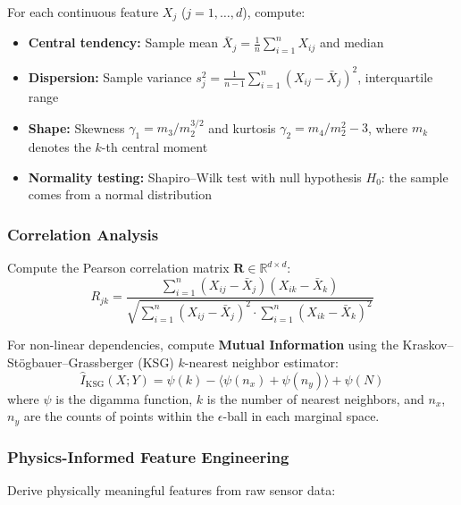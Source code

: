 \documentclass[12pt, a4paper]{article}
\newcommand{\R}{\mathbb{R}}
\begin{document}
For each continuous feature $X_j$ ($j = 1, \ldots, d$), compute:

\begin{itemize}[leftmargin=*]
    \item \textbf{Central tendency:} Sample mean $\bar{X}_j = \frac{1}{n}\sum_{i=1}^{n} X_{ij}$ and median
    \item \textbf{Dispersion:} Sample variance $s_j^2 = \frac{1}{n-1}\sum_{i=1}^{n}(X_{ij} - \bar{X}_j)^2$, interquartile range
    \item \textbf{Shape:} Skewness $\gamma_1 = m_3 / m_2^{3/2}$ and kurtosis $\gamma_2 = m_4 / m_2^2 - 3$, where $m_k$ denotes the $k$-th central moment
    \item \textbf{Normality testing:} Shapiro--Wilk test with null hypothesis $H_0$: the sample comes from a normal distribution
\end{itemize}

\subsubsection{Correlation Analysis}

Compute the Pearson correlation matrix $\mathbf{R} \in \R^{d \times d}$:
\begin{equation}\label{eq:pearson}
    R_{jk} = \frac{\sum_{i=1}^{n}(X_{ij} - \bar{X}_j)(X_{ik} - \bar{X}_k)}{\sqrt{\sum_{i=1}^{n}(X_{ij} - \bar{X}_j)^2 \cdot \sum_{i=1}^{n}(X_{ik} - \bar{X}_k)^2}}
\end{equation}

For non-linear dependencies, compute \textbf{Mutual Information} using the Kraskov--St\"ogbauer--Grassberger (KSG) $k$-nearest neighbor estimator:
\begin{equation}\label{eq:ksg}
    \hat{I}_{\mathrm{KSG}}(X; Y) = \psi(k) - \bigl\langle\psi(n_x) + \psi(n_y)\bigr\rangle + \psi(N)
\end{equation}
where $\psi$ is the digamma function, $k$ is the number of nearest neighbors, and $n_x$, $n_y$ are the counts of points within the $\epsilon$-ball in each marginal space.

\subsubsection{Physics-Informed Feature Engineering}

Derive physically meaningful features from raw sensor data:
\end{document}
